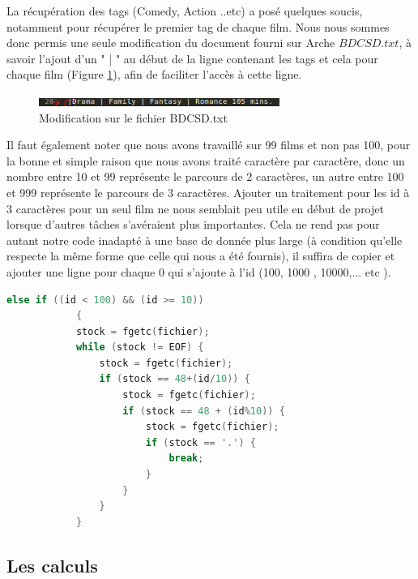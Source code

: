 \documentclass[light]{ceri}
\begin{document}
\indent La récupération des tags (Comedy, Action ..etc) a posé quelques soucis, notamment pour récupérer le premier tag de chaque film. Nous nous sommes donc permis une seule modification du document fourni sur Arche \begin{math} BDCSD.txt \end{math}, à savoir l'ajout d'un " | " au début de la ligne contenant les tags et cela pour chaque film (Figure \ref{modif}), afin de faciliter l'accès à cette ligne.

\begin{center}
\begin{figure}[!h]

    \centering
    \includegraphics[width=0.7\textwidth]{images/modif.png} 
  \caption{Modification sur le fichier BDCSD.txt }
    \label{modif}

\end{figure}   
\end{center}

\indent Il faut également noter que nous avons travaillé sur 99 films et non pas 100, pour la bonne et simple raison que nous avons traité caractère par caractère, donc un nombre entre 10 et 99 représente le parcours de 2 caractères, un autre entre 100 et 999 représente le parcours de 3 caractères. Ajouter un traitement pour les id à 3 caractères pour un seul film ne nous semblait peu utile en début de projet lorsque d'autres tâches s'avéraient plus importantes. Cela ne rend pas pour autant notre code inadapté à une base de donnée plus large (à condition qu'elle respecte la même forme que celle qui nous a été fournis), il suffira de copier et ajouter une ligne pour chaque 0 qui s'ajoute à l'id (100, 1000 , 10000,... etc ).

    \begin{lstlisting}[language=c]
     	else if ((id < 100) && (id >= 10))
     		{
     		stock = fgetc(fichier);
    		while (stock != EOF) {
    			stock = fgetc(fichier);
    			if (stock == 48+(id/10)) {
    				stock = fgetc(fichier);
    				if (stock == 48 + (id%10)) {
    					stock = fgetc(fichier);					
    					if (stock == '.') {
    						break;
    					}
    				}
				}
		    }
    \end{lstlisting}


\subsection{Les calculs}
\end{document}

